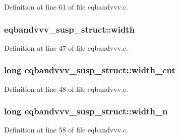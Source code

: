Definition at line 61 of file eqbandvvv.\+c.

\subsubsection[{\texorpdfstring{width}{width}}]{ eqbandvvv\+\_\+susp\+\_\+struct\+::width}\hypertarget{structeqbandvvv__susp__struct_a5b24a6bef0c9907111095be7d645190f}{}\label{structeqbandvvv__susp__struct_a5b24a6bef0c9907111095be7d645190f}


Definition at line 47 of file eqbandvvv.\+c.

\subsubsection[{\texorpdfstring{width\+\_\+cnt}{width_cnt}}]{\setlength{\rightskip}{0pt plus 5cm}long eqbandvvv\+\_\+susp\+\_\+struct\+::width\+\_\+cnt}\hypertarget{structeqbandvvv__susp__struct_af00282468ea353386ee2c035b1aa6efd}{}\label{structeqbandvvv__susp__struct_af00282468ea353386ee2c035b1aa6efd}


Definition at line 48 of file eqbandvvv.\+c.

\subsubsection[{\texorpdfstring{width\+\_\+n}{width_n}}]{\setlength{\rightskip}{0pt plus 5cm}long eqbandvvv\+\_\+susp\+\_\+struct\+::width\+\_\+n}\hypertarget{structeqbandvvv__susp__struct_a807d2cab3f9ffecf1e47a9dfe2907981}{}\label{structeqbandvvv__susp__struct_a807d2cab3f9ffecf1e47a9dfe2907981}


Definition at line 58 of file eqbandvvv.\+c.

